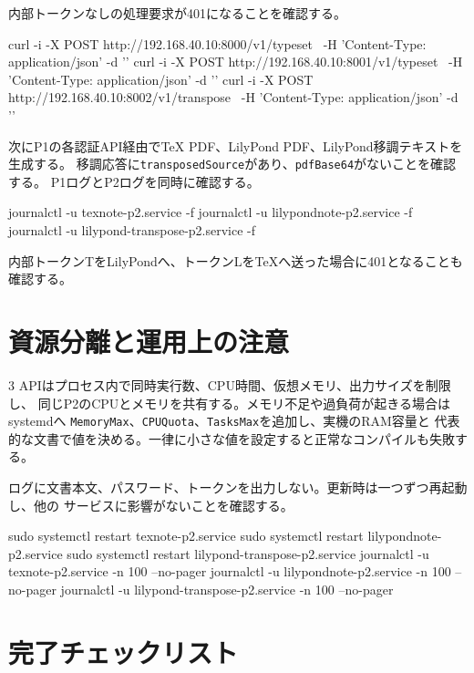 \documentclass[uplatex,a4paper,11pt]{jsarticle}
\begin{document}
内部トークンなしの処理要求が401になることを確認する。

\begin{command}
curl -i -X POST http://192.168.40.10:8000/v1/typeset \
  -H 'Content-Type: application/json' -d '{}'
curl -i -X POST http://192.168.40.10:8001/v1/typeset \
  -H 'Content-Type: application/json' -d '{}'
curl -i -X POST http://192.168.40.10:8002/v1/transpose \
  -H 'Content-Type: application/json' -d '{}'
\end{command}

次にP1の各認証API経由でTeX PDF、LilyPond PDF、LilyPond移調テキストを生成する。
移調応答に\texttt{transposedSource}があり、\texttt{pdfBase64}がないことを確認する。
P1ログとP2ログを同時に確認する。

\begin{command}
journalctl -u texnote-p2.service -f
journalctl -u lilypondnote-p2.service -f
journalctl -u lilypond-transpose-p2.service -f
\end{command}

内部トークンTをLilyPondへ、トークンLをTeXへ送った場合に401となることも確認する。

\section{資源分離と運用上の注意}

3 APIはプロセス内で同時実行数、CPU時間、仮想メモリ、出力サイズを制限し、
同じP2のCPUとメモリを共有する。メモリ不足や過負荷が起きる場合はsystemdへ
\texttt{MemoryMax}、\texttt{CPUQuota}、\texttt{TasksMax}を追加し、実機のRAM容量と
代表的な文書で値を決める。一律に小さな値を設定すると正常なコンパイルも失敗する。

ログに文書本文、パスワード、トークンを出力しない。更新時は一つずつ再起動し、他の
サービスに影響がないことを確認する。

\begin{command}
sudo systemctl restart texnote-p2.service
sudo systemctl restart lilypondnote-p2.service
sudo systemctl restart lilypond-transpose-p2.service
journalctl -u texnote-p2.service -n 100 --no-pager
journalctl -u lilypondnote-p2.service -n 100 --no-pager
journalctl -u lilypond-transpose-p2.service -n 100 --no-pager
\end{command}

\section{完了チェックリスト}
\end{document}

